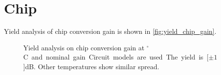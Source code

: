 		
	\section{Chip}
		Yield analysis of chip conversion gain is shown in \autoref{fig:yield_chip_gain}. 
		
			\begin{figure}[hbt!]
				\centering
				\caption[Spread on chip conversion gain.]{Yield analysis on chip conversion gain at \unit[55]{$^\circ$C} and nominal gain. Circuit models are used. The yield is \unit[$\pm1$]{dB}. Other temperatures show similar spread.}\label{fig:yield_chip_gain}
			\end{figure}